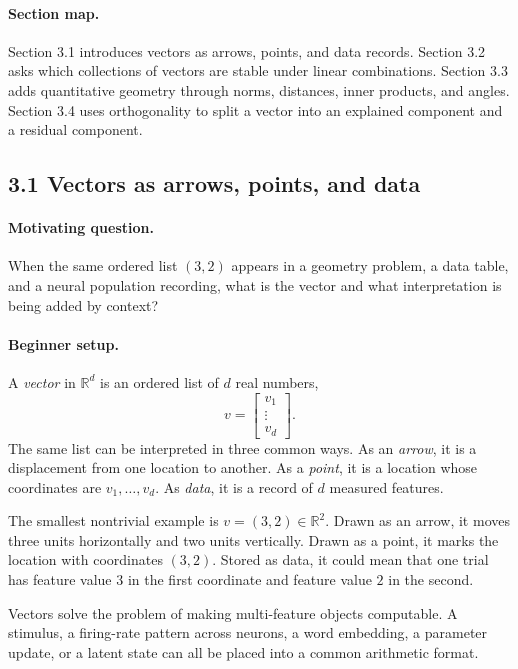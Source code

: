 \paragraph{Section map.}
Section 3.1 introduces vectors as arrows, points, and data records. Section 3.2 asks which collections of vectors are stable under linear combinations. Section 3.3 adds quantitative geometry through norms, distances, inner products, and angles. Section 3.4 uses orthogonality to split a vector into an explained component and a residual component.

\subsection{3.1 Vectors as arrows, points, and data}

\paragraph{Motivating question.}
When the same ordered list \((3,2)\) appears in a geometry problem, a data table, and a neural population recording, what is the vector and what interpretation is being added by context?

\paragraph{Beginner setup.}
A \emph{vector} in \(\mathbb{R}^d\) is an ordered list of \(d\) real numbers,
\[
v=\begin{bmatrix}v_1\\ \vdots\\ v_d\end{bmatrix}.
\]
The same list can be interpreted in three common ways. As an \emph{arrow}, it is a displacement from one location to another. As a \emph{point}, it is a location whose coordinates are \(v_1,\dots,v_d\). As \emph{data}, it is a record of \(d\) measured features.

The smallest nontrivial example is \(v=(3,2)\in\mathbb{R}^2\). Drawn as an arrow, it moves three units horizontally and two units vertically. Drawn as a point, it marks the location with coordinates \((3,2)\). Stored as data, it could mean that one trial has feature value \(3\) in the first coordinate and feature value \(2\) in the second.

Vectors solve the problem of making multi-feature objects computable. A stimulus, a firing-rate pattern across neurons, a word embedding, a parameter update, or a latent state can all be placed into a common arithmetic format.

